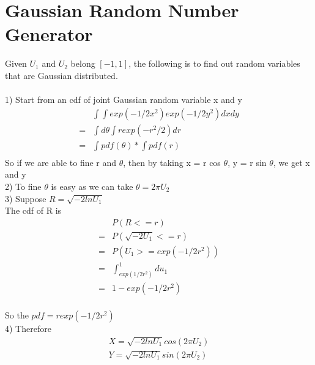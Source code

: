 \documentclass[a4paper]{article}
\begin{document}
\section{Gaussian Random Number Generator}
Given $U_1$ and $U_2$ belong $[-1,1]$, the following is to find out random variables that are Gaussian distributed.\\

\\
1)	Start from an cdf of joint Gaussian random variable x and y\\
\begin{align*}
& \int \int exp(-1/2 x^2)  exp(-1/2 y^2)  dx dy \\
 = & \int d \theta \int r exp(-r^2/2) dr\\
 = & \int pdf(\theta) * \int pdf(r)\\
\end{align*}
So if we are able to fine r and $\theta$, then by taking x = r cos $\theta$, y = r sin $\theta$, we get x and y\\
2)	To fine $\theta$ is easy as we can take $\theta = 2 \pi U_2$\\
3)	Suppose $R = \sqrt{-2 ln U_1}$\\
The cdf of R is
\begin{align*}
& P(R <= r) \\
 = &P(\sqrt{-2 U_1} <= r) \\
 = &P(U_1 >= exp(-1/2 r^2)) \\
 = &\int_{exp(1/2r^2)}^1 du_1 \\
 = &1 - exp(-1/2 r^2)	\\
\end{align*}

So the $pdf = r exp(-1/2 r^2)$\\
4)	Therefore
\begin{align*}
X = \sqrt{-2 ln U_1} cos(2\pi U_2) \\
Y = \sqrt{-2 ln U_1} sin(2\pi U_2) \\
\end{align*}
\end{document}
